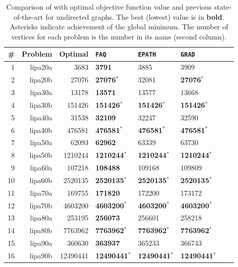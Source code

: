 \documentclass[10pt,journal,cspaper,compsoc]{IEEEtran}
\begin{document}
\begin{table}[h!]
\caption{Comparison of \FAQ with optimal objective function value and previous state-of-the-art for undirected graphs.  The best (lowest) value is in \textbf{bold}. Asterisks indicate achievement of the global minimum.  The number of vertices for each problem is the number in its name (second column).}
\begin{center}
\begin{tabular}{|r|r|r||l|l|l|l|l|}
	\hline 
	          \# &  Problem &      Optimal & \texttt{FAQ} & \texttt{EPATH} & \texttt{GRAD} \\
	\hline 
	           1 &  lipa20a &     3683 & \textbf{3791} &     3885 &     3909 \\ 
	           2 &  lipa20b &    27076 & \textbf{27076}$^*$ &    32081 &    \textbf{27076}$^*$ \\ 
	           3 &  lipa30a &    13178 & \textbf{13571} 	&    13577 &    13668 \\ 
	           4 &  lipa30b &   151426 & \textbf{151426}$^*$ & \textbf{151426}$^*$ &   \textbf{151426}$^*$ \\ 
	           5 &  lipa40a &    31538 & \textbf{32109} 	&    32247 &    32590 \\ 
	           6 &  lipa40b &   476581 & \textbf{476581}$^*$ &   \textbf{476581}$^*$ &   \textbf{476581}$^*$ \\ 
	           7 &  lipa50a &    62093 & \textbf{62962} &    63339 &    63730 \\ 
	           8 &  lipa50b &  1210244 & \textbf{1210244}$^*$ &  \textbf{1210244}$^*$ &  \textbf{1210244}$^*$ \\ 
	           9 &  lipa60a &   107218 & \textbf{108488} &   109168 &   109809 \\ 
	          10 &  lipa60b &  2520135 & \textbf{2520135}$^*$ &  \textbf{2520135}$^*$ &  \textbf{2520135}$^*$ \\ 
	          11 &  lipa70a &   169755 & \textbf{171820} &   172200 &   173172 \\ 
	          12 &  lipa70b &  4603200 & \textbf{4603200}$^*$ &  \textbf{4603200}$^*$ &  \textbf{4603200}$^*$ \\ 
	          13 &  lipa80a &   253195 & \textbf{256073} &   256601 &   258218 \\ 
	          14 &  lipa80b &  7763962 & \textbf{7763962}$^*$ &  \textbf{7763962}$^*$ &  \textbf{7763962}$^*$ \\ 
	          15 &  lipa90a &   360630 & \textbf{363937} &   365233 &   366743 \\ 
	          16 &  lipa90b & 12490441 & \textbf{12490441}$^*$ & \textbf{12490441}$^*$ & \textbf{12490441}$^*$ \\ 
	\hline
	\end{tabular}
\end{center}
\label{tab:directed}
\end{table}%
\end{document}
